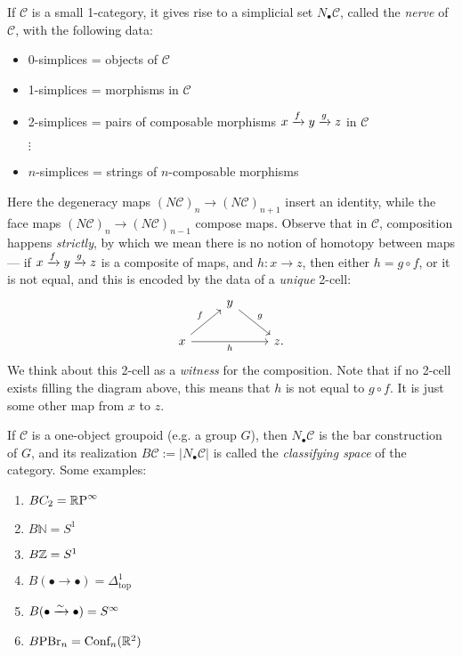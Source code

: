 \documentclass[11pt,openany]{book}
\begin{document}
\begin{example} If $\mathscr{C}$ is a small 1-category, it gives rise to a simplicial set $N_\bullet \mathscr{C}$, called the \textit{nerve} of $\mathscr{C}$, with the following data:
\begin{itemize}
    \item 0-simplices = objects of $\mathscr{C}$
    \item 1-simplices = morphisms in $\mathscr{C}$
    \item 2-simplices = pairs of composable morphisms $x \xrightarrow{f} y \xrightarrow{g} z$ in $\mathscr{C}$
    \item[$\vdots$]
    \item $n$-simplices = strings of $n$-composable morphisms
\end{itemize}
Here the degeneracy maps $(N\mathscr{C})_n \to (N\mathscr{C})_{n+1}$ insert an identity, while the face maps $(N\mathscr{C})_n \to (N\mathscr{C})_{n-1}$ compose maps. Observe that in $\mathscr{C}$, composition happens \textit{strictly}, by which we mean there is no notion of homotopy between maps --- if $x \xrightarrow{f} y \xrightarrow{g} z$ is a composite of maps, and $h \colon x \to z$, then either $h = g\circ f$, or it is not equal, and this is encoded by the data of a \textit{unique} 2-cell:
\[ \begin{tikzcd}
     & y\ar[dr,"g" above right]\\
    x\ar[ur,"f" above left]\ar[rr,"h" below] &  & z.
\end{tikzcd} \]
We think about this 2-cell as a \textit{witness} for the composition. Note that if no 2-cell exists filling the diagram above, this means that $h$ is not equal to $g\circ f$. It is just some other map from $x$ to $z$.
\end{example}

\begin{example} If $\mathscr{C}$ is a one-object groupoid (e.g. a group $G$), then $N_\bullet \mathscr{C}$ is the bar construction of $G$, and its realization $B \mathscr{C} := |N_\bullet \mathscr{C}|$ is called the \textit{classifying space} of the category. Some examples:
\begin{enumerate}
    \item $BC_2 = {\mathbb{R}\text{P}}^\infty$
    \item $B \mathbb{N} = S^1$
    \item $B\mathbb{Z} = S^1$
    \item $B (\bullet \to \bullet) = \Delta^1_\text{top}$
    \item $B (\bullet \xrightarrow{\sim} \bullet) = S^\infty$
    \item $B\text{PBr}_n = \text{Conf}_n(\mathbb{R}^2)$
\end{enumerate}
\end{example}
\end{document}
